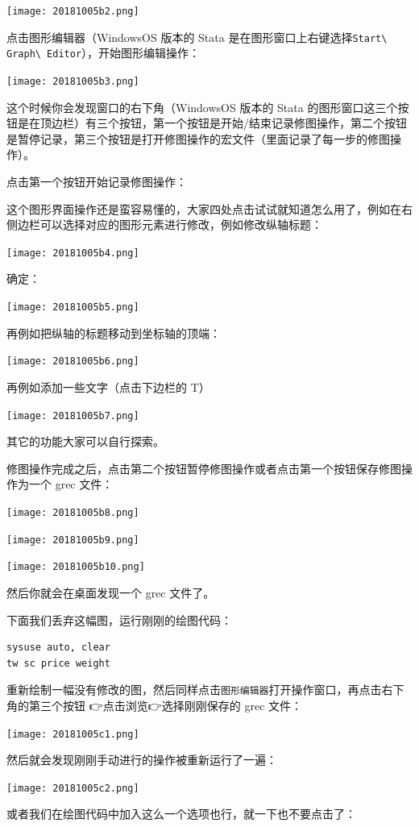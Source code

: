 \documentclass[cn,fancy,blue,11pt]{elegantbook}
\begin{document}
\texttt{[image: 20181005b2.png]}

点击图形编辑器（WindowsOS 版本的 Stata 是在图形窗口上右键选择\lstinline{Start\ Graph\ Editor}），开始图形编辑操作：

\texttt{[image: 20181005b3.png]}

这个时候你会发现窗口的右下角（WindowsOS 版本的 Stata 的图形窗口这三个按钮是在顶边栏）有三个按钮，第一个按钮是开始/结束记录修图操作，第二个按钮是暂停记录，第三个按钮是打开修图操作的宏文件（里面记录了每一步的修图操作）。

点击第一个按钮开始记录修图操作：

这个图形界面操作还是蛮容易懂的，大家四处点击试试就知道怎么用了，例如在右侧边栏可以选择对应的图形元素进行修改，例如修改纵轴标题：

\texttt{[image: 20181005b4.png]}

确定：

\texttt{[image: 20181005b5.png]}

再例如把纵轴的标题移动到坐标轴的顶端：

\texttt{[image: 20181005b6.png]}

再例如添加一些文字（点击下边栏的 T）

\texttt{[image: 20181005b7.png]}

其它的功能大家可以自行探索。

修图操作完成之后，点击第二个按钮暂停修图操作或者点击第一个按钮保存修图操作为一个 grec 文件：

\noindent\texttt{[image: 20181005b8.png]}

\noindent\texttt{[image: 20181005b9.png]}

\texttt{[image: 20181005b10.png]}

然后你就会在桌面发现一个 grec 文件了。

下面我们丢弃这幅图，运行刚刚的绘图代码：

\begin{lstlisting}
sysuse auto, clear
tw sc price weight
\end{lstlisting}

重新绘制一幅没有修改的图，然后同样点击\lstinline{图形编辑器}打开操作窗口，再点击右下角的第三个按钮 👉点击浏览👉选择刚刚保存的 grec 文件：

\texttt{[image: 20181005c1.png]}

然后就会发现刚刚手动进行的操作被重新运行了一遍：

\texttt{[image: 20181005c2.png]}

或者我们在绘图代码中加入这么一个选项也行，就一下也不要点击了：
\end{document}
